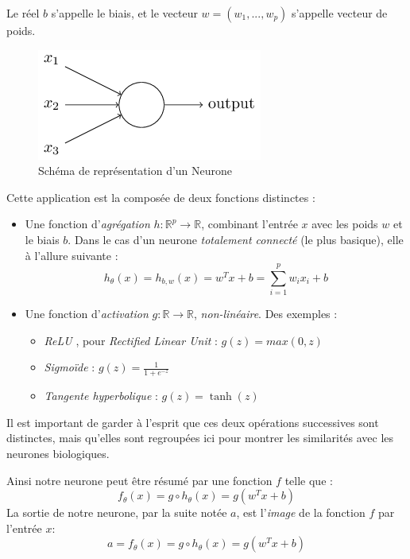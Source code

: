 \documentclass[a4paper, 11pt]{report}
\begin{document}
Le réel $b$ s'appelle le biais, et le vecteur $w = (w_1, ..., w_p)$ s'appelle vecteur de poids.
\begin{figure}[H]
	\centering
	\includegraphics[scale=0.6]{Images/Neuron.png}
	\caption{Schéma de représentation d'un Neurone}
\end{figure}
Cette application est la composée de deux fonctions distinctes :
\begin{itemize}
	\item Une fonction d’\emph{agrégation} $h : \mathbb{R}^p \rightarrow \mathbb{R}$, combinant l'entrée $x$ avec les poids $w$ et le biais $b$.
	      	      Dans le cas d'un neurone \emph{totalement connecté} (le plus basique), elle à l'allure suivante :
	      $$h_\theta(x) = h_{b,w}(x) = w^Tx + b = \sum_{i=1}^{p}{w_i x_i} + b$$
	\item Une fonction d'\emph{activation} $g : \mathbb{R} \rightarrow \mathbb{R}$, \emph{non-linéaire}.
	      	      Des exemples :
	      \begin{itemize}
	      	\item \emph{ReLU} \citep{Glorot2011}, pour \emph{Rectified Linear Unit} : $g(z) = max(0,z)$
	      	\item \emph{Sigmoïde} : $g(z) = \frac{1}{1+e^{-z}}$
	      	\item \emph{Tangente hyperbolique} : $g(z) = \tanh(z)$
	      \end{itemize}
\end{itemize}
Il est important de garder à l'esprit que ces deux opérations successives sont distinctes, mais qu'elles sont regroupées ici pour montrer les similarités avec les neurones biologiques.

Ainsi notre neurone peut être résumé par une fonction $f$ telle que :
$$f_\theta(x) = g \circ h_\theta(x) = g(w^Tx + b)$$
La sortie de notre neurone, par la suite notée $a$, est l'\emph{image} de la fonction $f$ par l'entrée $x$:
$$a = f_\theta(x) = g \circ h_\theta(x) = g(w^Tx + b)$$
\end{document}
